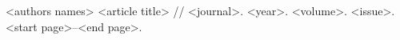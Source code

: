 \begin{thebibliography}{10}
	
	 <authors names> <article title> // <journal>. <year>. <volume>. <issue>. <start page>--<end page>.
	
\end{thebibliography}